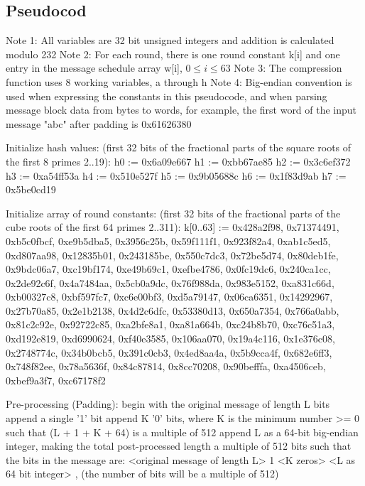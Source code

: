 \documentclass{article}
\begin{document}
\subsection{Pseudocod}

      Note 1: All variables are 32 bit unsigned integers and addition is calculated modulo 232
      Note 2: For each round, there is one round constant k[i] and one entry in the message schedule array w[i], $0 \le i \le 63$
      Note 3: The compression function uses 8 working variables, a through h
      Note 4: Big-endian convention is used when expressing the constants in this pseudocode,
      and when parsing message block data from bytes to words, for example,
      the first word of the input message "abc" after padding is 0x61626380

      Initialize hash values:
      (first 32 bits of the fractional parts of the square roots of the first 8 primes 2..19):
      h0 := 0x6a09e667
      h1 := 0xbb67ae85
      h2 := 0x3c6ef372
      h3 := 0xa54ff53a
      h4 := 0x510e527f
      h5 := 0x9b05688c
      h6 := 0x1f83d9ab
      h7 := 0x5be0cd19

      Initialize array of round constants:
      (first 32 bits of the fractional parts of the cube roots of the first 64 primes 2..311):
      k[0..63] :=
      0x428a2f98, 0x71374491, 0xb5c0fbcf, 0xe9b5dba5, 0x3956c25b, 0x59f111f1, 0x923f82a4, 0xab1c5ed5,
      0xd807aa98, 0x12835b01, 0x243185be, 0x550c7dc3, 0x72be5d74, 0x80deb1fe, 0x9bdc06a7, 0xc19bf174,
      0xe49b69c1, 0xefbe4786, 0x0fc19dc6, 0x240ca1cc, 0x2de92c6f, 0x4a7484aa, 0x5cb0a9dc, 0x76f988da,
      0x983e5152, 0xa831c66d, 0xb00327c8, 0xbf597fc7, 0xc6e00bf3, 0xd5a79147, 0x06ca6351, 0x14292967,
      0x27b70a85, 0x2e1b2138, 0x4d2c6dfc, 0x53380d13, 0x650a7354, 0x766a0abb, 0x81c2c92e, 0x92722c85,
      0xa2bfe8a1, 0xa81a664b, 0xc24b8b70, 0xc76c51a3, 0xd192e819, 0xd6990624, 0xf40e3585, 0x106aa070,
      0x19a4c116, 0x1e376c08, 0x2748774c, 0x34b0bcb5, 0x391c0cb3, 0x4ed8aa4a, 0x5b9cca4f, 0x682e6ff3,
      0x748f82ee, 0x78a5636f, 0x84c87814, 0x8cc70208, 0x90befffa, 0xa4506ceb, 0xbef9a3f7, 0xc67178f2

      Pre-processing (Padding):
      begin with the original message of length L bits
      append a single '1' bit
      append K '0' bits, where K is the minimum number >= 0 such that (L + 1 + K + 64) is a multiple of 512
      append L as a 64-bit big-endian integer, making the total post-processed length a multiple of 512 bits
      such that the bits in the message are: <original message of length L> 1 <K zeros> <L as 64 bit integer> , (the number of bits will be a multiple of 512)
\end{document}
